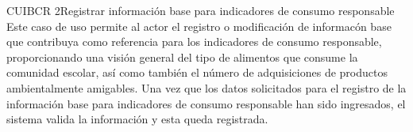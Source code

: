 
\begin{UseCase}{CUIBCR 2}{Registrar información base para indicadores de consumo responsable}
    {
	  Este caso de uso permite al actor el registro o modificación de informacón base que contribuya como referencia para los indicadores de consumo responsable, proporcionando una visión general del tipo de alimentos que consume la comunidad escolar, así como también el número de adquisiciones de productos ambientalmente amigables. Una vez que los datos solicitados para el registro de la información base para indicadores de consumo responsable han sido ingresados, el sistema valida la información y esta queda registrada.
    }
    

\end{UseCase}
